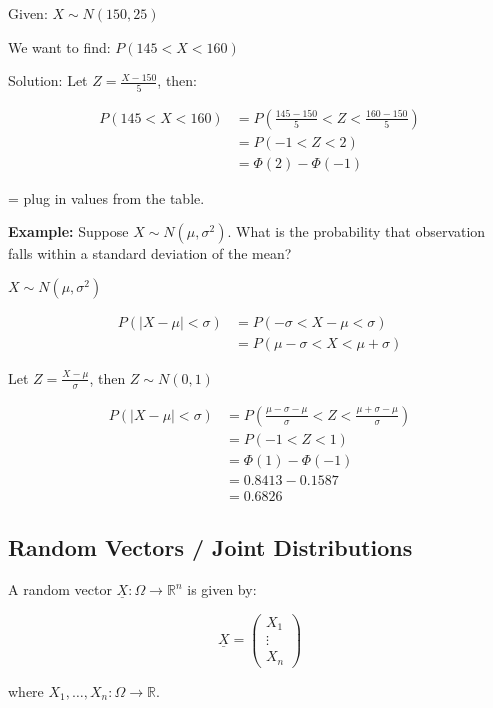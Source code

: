 \documentclass{article}
\begin{document}
    Given: $X \sim N(150, 25)$

    We want to find: $P(145 < X < 160)$

    Solution:
    Let $Z = \frac{X - 150}{5}$, then:

    \begin{align*}
    P(145 < X < 160) &= P\left(\frac{145 - 150}{5} < Z < \frac{160 - 150}{5}\right) \\
    &= P(-1 < Z < 2) \\
    &= \Phi(2) - \Phi(-1)
    \end{align*}

    = plug in values from the table.
    
    \textbf{Example:} Suppose $X \sim N(\mu, \sigma^2)$. What is the probability that observation falls within a standard deviation of the mean?

    $X \sim N(\mu, \sigma^2)$

    \begin{align*}
    P(|X - \mu| < \sigma) &= P(-\sigma < X - \mu < \sigma) \\
    &= P(\mu - \sigma < X < \mu + \sigma)
    \end{align*}

    Let $Z = \frac{X - \mu}{\sigma}$, then $Z \sim N(0, 1)$

    \begin{align*}
    P(|X - \mu| < \sigma) &= P\left(\frac{\mu - \sigma - \mu}{\sigma} < Z < \frac{\mu + \sigma - \mu}{\sigma}\right) \\
    &= P(-1 < Z < 1) \\
    &= \Phi(1) - \Phi(-1) \\
    &= 0.8413 - 0.1587 \\
    &= 0.6826
    \end{align*}

    \subsection*{Random Vectors / Joint Distributions}

    A random vector $\underline{X} : \Omega \rightarrow \mathbb{R}^n$ is given by:

    \[\underline{X} = \begin{pmatrix} X_1 \\ \vdots \\ X_n \end{pmatrix}\]

    where $X_1, \ldots, X_n : \Omega \rightarrow \mathbb{R}$.
\end{document}
